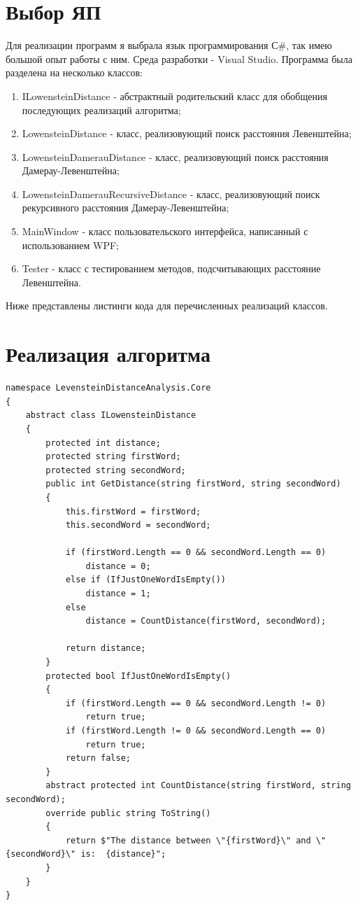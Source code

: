 \documentclass[12pt]{report}
\begin{document}
\section{Выбор ЯП}
Для реализации программ я выбрала язык программирования С\#, так имею большой опыт работы с ним. Среда разработки - Visual Studio.
Программа была разделена на несколько классов:
\begin{enumerate}
  	\item ILowensteinDistance - абстрактный родительский класс для обобщения последующих реализаций алгоритма;
	\item LowensteinDistance - класс, реализовующий поиск расстояния Левенштейна;
	\item LowensteinDamerauDistance - класс, реализовующий поиск расстояния Дамерау-Левенштейна;
	\item LowensteinDamerauRecursiveDistance - класс, реализовующий поиск рекурсивного расстояния Дамерау-Левенштейна;
	\item MainWindow - класс пользовательского интерфейса, написанный с использованием WPF;
	\item Tester - класс с тестированием методов, подсчитывающих расстояние Левенштейна.
\end{enumerate}
Ниже представлены листинги кода для перечисленных реализаций классов.

\section{Реализация алгоритма}

\begin{lstlisting}[label=some-code,caption=Абстрактный класс для последующих реализаций алгоритмов Левенштейна]
namespace LevensteinDistanceAnalysis.Core
{
    abstract class ILowensteinDistance
    {
        protected int distance;
        protected string firstWord;
        protected string secondWord;
        public int GetDistance(string firstWord, string secondWord)
        {
            this.firstWord = firstWord;
            this.secondWord = secondWord;

            if (firstWord.Length == 0 && secondWord.Length == 0)
                distance = 0;
            else if (IfJustOneWordIsEmpty())
                distance = 1;
            else
                distance = CountDistance(firstWord, secondWord);
            
            return distance;
        }
        protected bool IfJustOneWordIsEmpty()
        {
            if (firstWord.Length == 0 && secondWord.Length != 0)
                return true;
            if (firstWord.Length != 0 && secondWord.Length == 0)
                return true;
            return false;
        }
        abstract protected int CountDistance(string firstWord, string secondWord);
        override public string ToString()
        {
            return $"The distance between \"{firstWord}\" and \"{secondWord}\" is:  {distance}";
        }
    }
}
\end{lstlisting}
\end{document}
